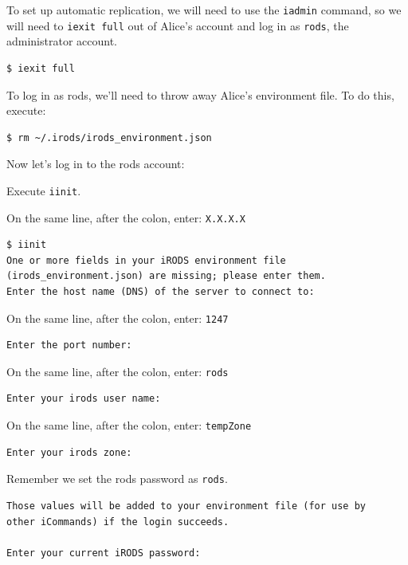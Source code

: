 \documentclass[10pt,oneside]{memoir}
\begin{document}
To set up automatic replication, we will need to use the \texttt{iadmin} command, so we will need to \texttt{iexit full} out of Alice's account and log in as \texttt{rods}, the administrator account.

\begin{lstlisting}
$ iexit full
\end{lstlisting}

To log in as rods, we'll need to throw away Alice's environment file. To do this, execute:

\begin{lstlisting}
$ rm ~/.irods/irods_environment.json
\end{lstlisting}

Now let's log in to the rods account:

Execute \texttt{iinit}.

On the same line, after the colon, enter: \texttt{X.X.X.X}

\begin{lstlisting}[basicstyle=\scriptsize\ttfamily]
$ iinit
One or more fields in your iRODS environment file (irods_environment.json) are missing; please enter them.
Enter the host name (DNS) of the server to connect to:
\end{lstlisting}

On the same line, after the colon, enter: \texttt{1247}

\begin{lstlisting}[basicstyle=\scriptsize\ttfamily]
Enter the port number:
\end{lstlisting}

On the same line, after the colon, enter: \texttt{rods}

\begin{lstlisting}[basicstyle=\scriptsize\ttfamily]
Enter your irods user name:
\end{lstlisting}

On the same line, after the colon, enter: \texttt{tempZone}

\begin{lstlisting}[basicstyle=\scriptsize\ttfamily]
Enter your irods zone:
\end{lstlisting}

\newpage

Remember we set the rods password as \texttt{rods}.

\begin{lstlisting}[basicstyle=\scriptsize\ttfamily]
Those values will be added to your environment file (for use by
other iCommands) if the login succeeds.

Enter your current iRODS password:
\end{lstlisting}
\end{document}
